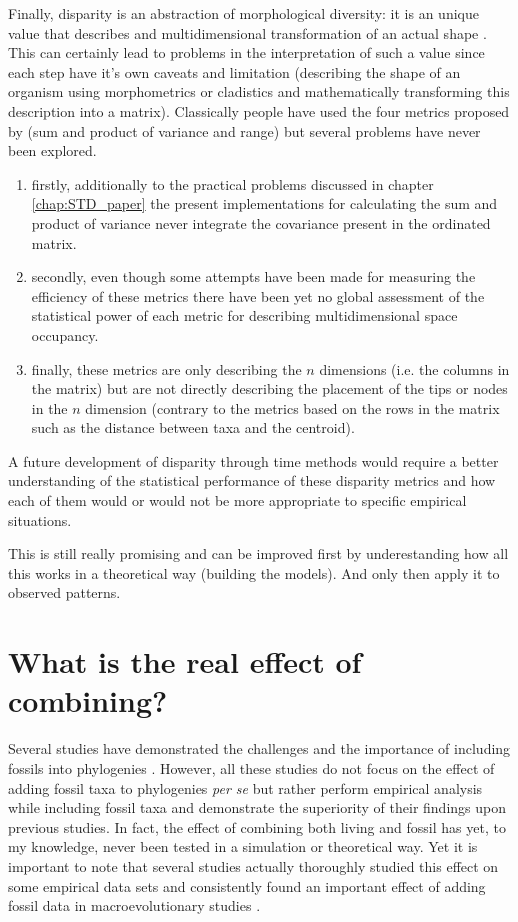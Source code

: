 Finally, disparity is an abstraction of morphological diversity: it is an unique value that describes and multidimensional transformation of an actual shape \citep{Wills1994,foote1997evolution}.
This can certainly lead to problems in the interpretation of such a value since each step have it's own caveats and limitation (describing the shape of an organism using morphometrics or cladistics and mathematically transforming this description into a matrix).
Classically people have used the four metrics proposed by \cite{Wills1994} (sum and product of variance and range) but several problems have never been explored.
\begin{enumerate}
\item firstly, additionally to the practical problems discussed in chapter \ref{chap:STD_paper} the present implementations for calculating the sum and product of variance never integrate the covariance present in the ordinated matrix.
\item secondly, even though some attempts have been made for measuring the efficiency of these metrics \citep{Ciampaglio2001} there have been yet no global assessment of the statistical power of each metric for describing multidimensional space occupancy.
\item finally, these metrics are only describing the $n$ dimensions (i.e. the columns in the matrix) but are not directly describing the placement of the tips or nodes in the $n$ dimension (contrary to the metrics based on the rows in the matrix such as the distance between taxa and the centroid).
\end{enumerate}
A future development of disparity through time methods would require a better understanding of the statistical performance of these disparity metrics and how each of them would or would not be more appropriate to specific empirical situations.


This is still really promising and can be improved first by underestanding how all this works in a theoretical way (building the models).
And only then apply it to observed patterns.

\section{What is the real effect of combining?}
Several studies have demonstrated the challenges and the importance of including fossils into phylogenies \citep[e.g.][]{ronquista2012,slaterphylogenetic2013,Wood01032013,beckancient2014,Dembo2015}.
However, all these studies do not focus on the effect of adding fossil taxa to phylogenies \textit{per se} but rather perform empirical analysis while including fossil taxa and demonstrate the superiority of their findings upon previous studies.
In fact, the effect of combining both living and fossil has yet, to my knowledge, never been tested in a simulation or theoretical way.
Yet it is important to note that several studies actually thoroughly studied this effect on some empirical data sets and consistently found an important effect of adding fossil data in macroevolutionary studies \citep{Finarelli2006,Slateretal2012,slaterphylogenetic2013,SlaterPennel2014,pant2014complex,Mitchell2015}.

